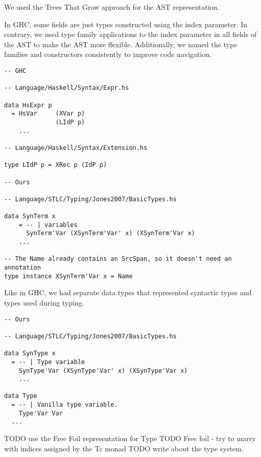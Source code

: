 We used the Trees That Grow approach \cite{trees-that-grow-2016} for the AST representation.

In GHC, some fields are just types constructed using the index parameter. In contrary, we used type family applications to the index parameter in all fields of the AST to make the AST more flexible. Additionally, we named the type families and constructors consistently to improve code navigation.

\begin{verbatim}
-- GHC

-- Language/Haskell/Syntax/Expr.hs

data HsExpr p
  = HsVar     (XVar p)
              (LIdP p)
    ...

-- Language/Haskell/Syntax/Extension.hs

type LIdP p = XRec p (IdP p)

-- Ours

-- Language/STLC/Typing/Jones2007/BasicTypes.hs

data SynTerm x
    = -- | variables
      SynTerm'Var (XSynTerm'Var' x) (XSynTerm'Var x)
    ...

-- The Name already contains an SrcSpan, so it doesn't need an annotation
type instance XSynTerm'Var x = Name
\end{verbatim}

Like in GHC, we had separate data types that represented syntactic types and types used during typing.

\begin{verbatim}
-- Ours

-- Language/STLC/Typing/Jones2007/BasicTypes.hs

data SynType x
  = -- | Type variable
    SynType'Var (XSynType'Var' x) (XSynType'Var x)
    ...

data Type
  = -- | Vanilla type variable.
    Type'Var Var
  ...
\end{verbatim}


TODO use the Free Foil representation for Type
TODO Free foil - try to marry with indices assigned by the Tc monad
TODO write about the type system.



